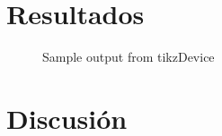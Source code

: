 \documentclass[12pt]{article}
\begin{document}
	
	
	\section{Resultados}
	
	\begin{figure}
		\centering
		
		\caption{Sample output from tikzDevice}
		\label{plot:test}
	\end{figure}
	
	\section{Discusión}
	
	\printbibliography[title={Referencias}]
	
\end{document}
